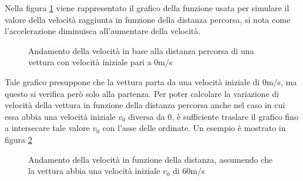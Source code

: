 \documentclass[a4paper,11pt, twoside, openright]{book}
\begin{document}
	Nella figura \ref{fgr:GraficoVelocita} viene rappresentato il grafico della funzione usata per simulare il valore
	della velocità raggiunta in funzione della distanza percorsa, si nota come l'accelerazione diminuisca 
	all'aumentare della velocità.
	
	\begin{figure}[ht]
	  \centering
	  \caption{Andamento della velocità in base alla distanza percorsa di una vettura con velocità iniziale
		    pari a 0m/s}
	  \label{fgr:GraficoVelocita}
	\end{figure}
	
	Tale grafico presuppone che la vettura parta da una velocità iniziale di 0m/s, ma questo si verifica però solo 
	alla partenza.
	Per poter calcolare la variazione di velocità della vettura in funzione della distanza percorsa anche nel caso
	in cui essa
	abbia una velocità iniziale $v_0$ diversa da 0, è sufficiente traslare il grafico fino a intersecare tale valore $v_0$
	con l'asse delle ordinate. Un esempio è mostrato in figura \ref{fgr:GraficoVelocitaTraslato}
	
	\begin{figure}[ht]
	  \centering
	  \caption{Andamento della velocità in funzione della distanza, assumendo che la vettura abbia una
		    velocità iniziale $v_0$ di 60m/s}
	  \label{fgr:GraficoVelocitaTraslato}

	\end{figure}
\end{document}
